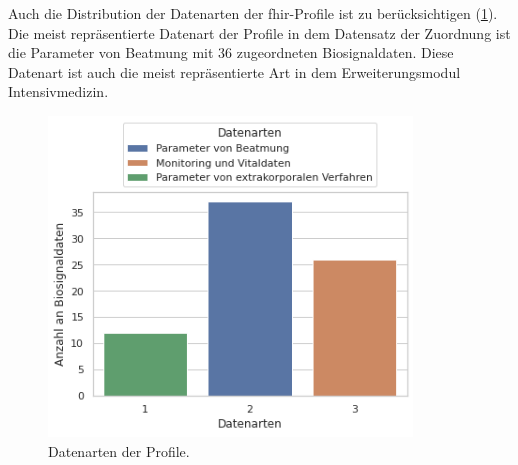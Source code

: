 Auch die Distribution der Datenarten der \ac{fhir}-Profile ist zu berücksichtigen (\ref{fig:datenarten}). Die meist repräsentierte Datenart der Profile in dem Datensatz der Zuordnung ist die \glqq Parameter von Beatmung\grqq{} mit 36 zugeordneten Biosignaldaten. Diese Datenart ist auch die meist repräsentierte Art in dem Erweiterungsmodul \glqq Intensivmedizin\grqq{}.

\clearpage

\begin{figure}[ht]
	\centering
	\includegraphics[height=8.5cm]{figures/datenarten}
	\caption[Datenarten der Profile]{Datenarten der Profile.}
	\label{fig:datenarten}
\end{figure}

